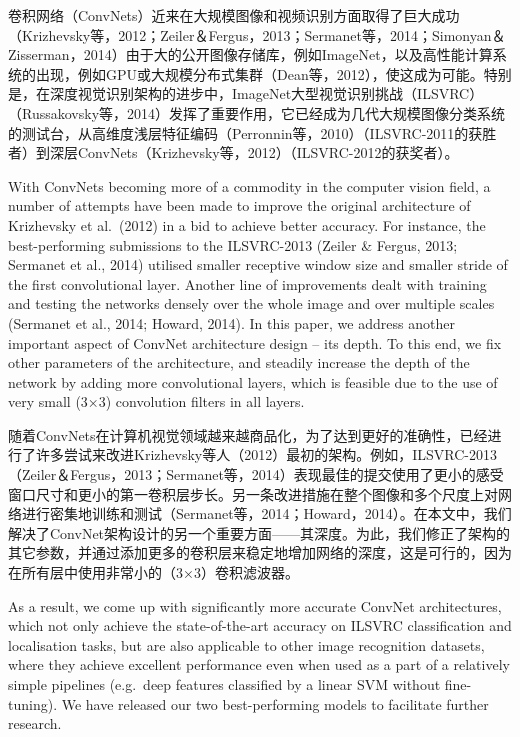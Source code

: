 \documentclass[12pt,a4paper,UTF8,twoside]{book}
\begin{document}
卷积网络（ConvNets）近来在大规模图像和视频识别方面取得了巨大成功（Krizhevsky等，2012；Zeiler＆Fergus，2013；Sermanet等，2014；Simonyan＆Zisserman，2014）由于大的公开图像存储库，例如ImageNet，以及高性能计算系统的出现，例如GPU或大规模分布式集群（Dean等，2012），使这成为可能。特别是，在深度视觉识别架构的进步中，ImageNet大型视觉识别挑战（ILSVRC）（Russakovsky等，2014）发挥了重要作用，它已经成为几代大规模图像分类系统的测试台，从高维度浅层特征编码（Perronnin等，2010）（ILSVRC-2011的获胜者）到深层ConvNets（Krizhevsky等，2012）（ILSVRC-2012的获奖者）。

With ConvNets becoming more of a commodity in the computer vision field, a number of attempts have been made to improve the original architecture of Krizhevsky et al.~(2012) in a bid to achieve better accuracy. For instance, the best-performing submissions to the ILSVRC-2013 (Zeiler \& Fergus, 2013; Sermanet et al., 2014) utilised smaller receptive window size and smaller stride of the first convolutional layer. Another line of improvements dealt with training and testing the networks densely over the whole image and over multiple scales (Sermanet et al., 2014; Howard, 2014). In this paper, we address another important aspect of ConvNet architecture design -- its depth. To this end, we fix other parameters of the architecture, and steadily increase the depth of the network by adding more convolutional layers, which is feasible due to the use of very small (3×3) convolution filters in all layers.

随着ConvNets在计算机视觉领域越来越商品化，为了达到更好的准确性，已经进行了许多尝试来改进Krizhevsky等人（2012）最初的架构。例如，ILSVRC-2013（Zeiler＆Fergus，2013；Sermanet等，2014）表现最佳的提交使用了更小的感受窗口尺寸和更小的第一卷积层步长。另一条改进措施在整个图像和多个尺度上对网络进行密集地训练和测试（Sermanet等，2014；Howard，2014）。在本文中，我们解决了ConvNet架构设计的另一个重要方面------其深度。为此，我们修正了架构的其它参数，并通过添加更多的卷积层来稳定地增加网络的深度，这是可行的，因为在所有层中使用非常小的（3×3）卷积滤波器。

As a result, we come up with significantly more accurate ConvNet architectures, which not only achieve the state-of-the-art accuracy on ILSVRC classification and localisation tasks, but are also applicable to other image recognition datasets, where they achieve excellent performance even when used as a part of a relatively simple pipelines (e.g.~deep features classified by a linear SVM without fine-tuning). We have released our two best-performing models to facilitate further research.
\end{document}
